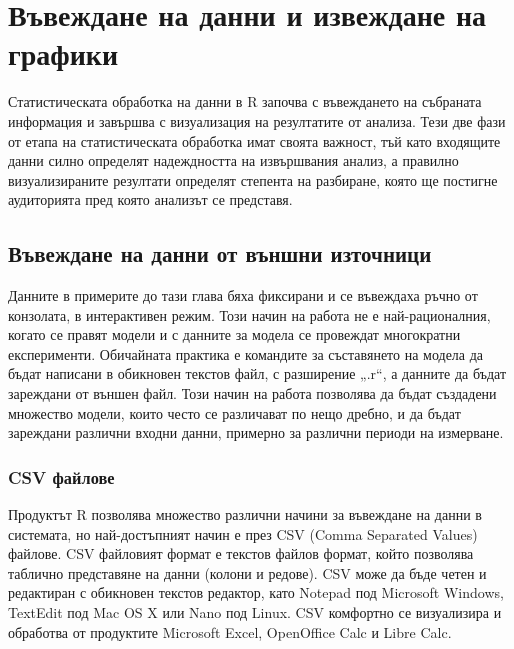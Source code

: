 ﻿\newpage
\chapter{Въвеждане на данни и извеждане на графики}
\label{chapter04}

Статистическата обработка на данни в R започва с въвеждането на събраната информация и завършва с визуализация на резултатите от анализа. Тези две фази от етапа на статистическата обработка имат своята важност, тъй като входящите данни силно определят надеждността на извършвания анализ, а правилно визуализираните резултати определят степента на разбиране, която ще постигне аудиторията пред която анализът се представя. 

\section{Въвеждане на данни от външни източници}

Данните в примерите до тази глава бяха фиксирани и се въвеждаха ръчно от конзолата, в интерактивен режим. Този начин на работа не е най-рационалния, когато се правят модели и с данните за модела се провеждат многократни експерименти. Обичайната практика е командите за съставянето на модела да бъдат написани в обикновен текстов файл, с разширение „.r“, а данните да бъдат зареждани от външен файл. Този начин на работа позволява да бъдат създадени множество модели, които често се различават по нещо дребно, и да бъдат зареждани различни входни данни, примерно за различни периоди на измерване. 

\subsection{CSV файлове}

Продуктът R позволява множество различни начини за въвеждане на данни в системата, но най-достъпният начин е през CSV (Comma Separated Values) файлове. CSV файловият формат е текстов файлов формат, който позволява таблично представяне на данни (колони и редове). CSV може да бъде четен и редактиран с обикновен текстов редактор, като Notepad под Microsoft Windows, TextEdit под Mac OS X или Nano под Linux. CSV комфортно се визуализира и обработва от продуктите Microsoft Excel, OpenOffice Calc и Libre Calc. 

